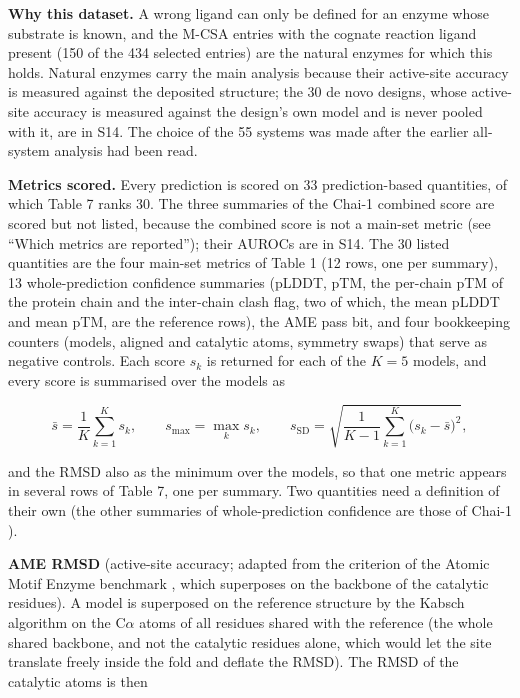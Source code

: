 \documentclass[
  10pt,
]{article}
\DeclareRobustCommand{\_}{\textunderscore\hspace{0pt}}
\begin{document}
\textbf{Why this
dataset.} A wrong
ligand can only be
defined for an
enzyme whose
substrate is known,
and the M-CSA
entries with the
cognate reaction
ligand present (150
of the 434 selected
entries) are the
natural enzymes for
which this holds.
Natural enzymes
carry the main
analysis because
their active-site
accuracy is measured
against the
deposited structure;
the 30 de novo
designs, whose
active-site accuracy
is measured against
the design's own
model and is never
pooled with it, are
in S14. The choice
of the 55 systems
was made after the
earlier all-system
analysis had been
read.

\textbf{Metrics
scored.} Every
prediction is scored
on 33
prediction-based
quantities, of which
Table 7 ranks 30.
The three summaries
of the Chai-1
combined score are
scored but not
listed, because the
combined score is
not a main-set
metric (see ``Which
metrics are
reported''); their
AUROCs are in S14.
The 30 listed
quantities are the
four main-set
metrics of Table 1
(12 rows, one per
summary), 13
whole-prediction
confidence summaries
(pLDDT, pTM, the
per-chain pTM of the
protein chain and
the inter-chain
clash flag, two of
which, the mean
pLDDT and mean pTM,
are the reference
rows), the AME pass
bit, and four
bookkeeping counters
(models, aligned and
catalytic atoms,
symmetry swaps) that
serve as negative
controls. Each score
\(s_k\) is returned
for each of the
\(K = 5\) models,
and every score is
summarised over the
models as

\begin{equation*}\bar s = \frac{1}{K}\sum_{k=1}^{K} s_k, \qquad s_{\max} = \max_{k} s_k, \qquad s_{\mathrm{SD}} = \sqrt{\frac{1}{K-1}\sum_{k=1}^{K}\big(s_k - \bar s\big)^{2}}, \tag{6}\end{equation*}

and the RMSD also as
the minimum over the
models, so that one
metric appears in
several rows of
Table 7, one per
summary. Two
quantities need a
definition of their
own (the other
summaries of
whole-prediction
confidence are those
of Chai-1
\cite{chai2024}).

\textbf{AME RMSD}
(active-site
accuracy; adapted
from the criterion
of the Atomic Motif
Enzyme benchmark
\cite{ahern2026},
which superposes on
the backbone of the
catalytic residues).
A model is
superposed on the
reference structure
by the Kabsch
algorithm on the
C\(\alpha\) atoms of
all residues shared
with the reference
(the whole shared
backbone, and not
the catalytic
residues alone,
which would let the
site translate
freely inside the
fold and deflate the
RMSD). The RMSD of
the catalytic atoms
is then
\end{document}
